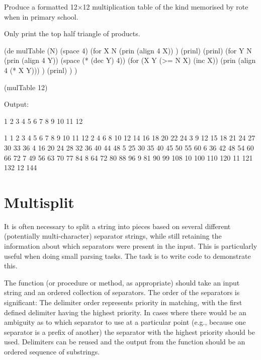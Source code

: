 Produce a formatted 12×12 multiplication table of the kind memorised by
rote when in primary school.

Only print the top half triangle of products.


\begin{wideverbatim}

(de mulTable (N)
   (space 4)
   (for X N
      (prin (align 4 X)) )
   (prinl)
   (prinl)
   (for Y N
      (prin (align 4 Y))
      (space (* (dec Y) 4))
      (for (X Y (>= N X) (inc X))
         (prin (align 4 (* X Y))) )
      (prinl) ) )

(mulTable 12)

Output:

       1   2   3   4   5   6   7   8   9  10  11  12

   1   1   2   3   4   5   6   7   8   9  10  11  12
   2       4   6   8  10  12  14  16  18  20  22  24
   3           9  12  15  18  21  24  27  30  33  36
   4              16  20  24  28  32  36  40  44  48
   5                  25  30  35  40  45  50  55  60
   6                      36  42  48  54  60  66  72
   7                          49  56  63  70  77  84
   8                              64  72  80  88  96
   9                                  81  90  99 108
  10                                     100 110 120
  11                                         121 132
  12                                             144

\end{wideverbatim}

\pagebreak{}
\section*{Multisplit}

It is often necessary to split a string into pieces based on several
different (potentially multi-character) separator strings, while still
retaining the information about which separators were present in the
input. This is particularly useful when doing small parsing tasks. The
task is to write code to demonstrate this.

The function (or procedure or method, as appropriate) should take an
input string and an ordered collection of separators. The order of the
separators is significant: The delimiter order represents priority in
matching, with the first defined delimiter having the highest priority.
In cases where there would be an ambiguity as to which separator to use
at a particular point (e.g., because one separator is a prefix of
another) the separator with the highest priority should be used.
Delimiters can be reused and the output from the function should be an
ordered sequence of substrings.

